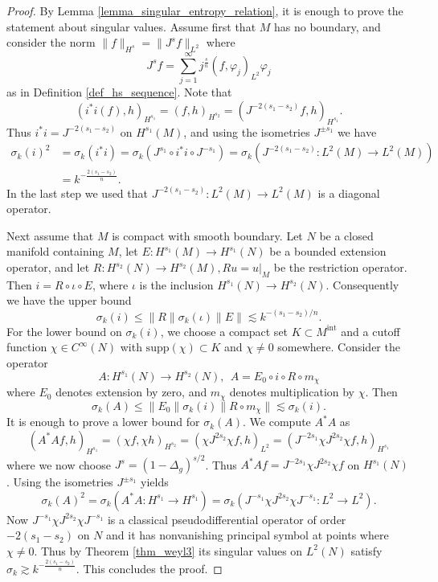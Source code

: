\documentclass[12pt,twoside]{amsart}
\numberwithin{equation}{section}
\renewcommand{\leq}{\leqslant}
\newcommand{\norm}[1]{\lVert #1 \rVert}         %
\begin{document}
\begin{proof}
By Lemma \ref{lemma_singular_entropy_relation}, it is enough to prove the statement about singular values. Assume first that $M$ has no boundary, and consider the norm $\norm{f}_{H^s} = \norm{J^s f}_{L^2}$ where $$J^s f = \sum_{j=1}^{\infty} j^{\frac{s}{n}} (f,\varphi_j)_{L^2} \varphi_j$$ as in Definition \ref{def_hs_sequence}. Note that 
\[
(i^* i(f), h)_{H^{s_1}} = (f, h)_{H^{s_2}} = (J^{-2(s_1-s_2)} f, h)_{H^{s_1}}.
\]
Thus $i^* i = J^{-2(s_1-s_2)}$ on $H^{s_1}(M)$, and using the isometries $J^{\pm s_1}$ we have 
\begin{align*}
\sigma_k(i)^2 &= \sigma_k(i^* i) = \sigma_k(J^{s_1} \circ i^* i \circ J^{-s_1}) = \sigma_k( J^{-2(s_1-s_2)}: L^2(M) \to L^2(M) ) \\
 &= k^{-\frac{2(s_1-s_2)}{n}}.
\end{align*}
In the last step we used that $J^{-2(s_1-s_2)}: L^2(M) \to L^2(M)$ is a diagonal operator.

Next assume that $M$ is compact with smooth boundary. Let $N$ be a closed manifold containing $M$, let $E: H^{s_1}(M) \to H^{s_1}(N)$ be a bounded extension operator, and let $R: H^{s_2}(N) \to H^{s_2}(M), Ru = u|_M$ be the restriction operator. Then $i = R \circ \iota \circ E$, where $\iota$ is the inclusion $H^{s_1}(N) \to H^{s_2}(N)$. Consequently we have the upper bound 
\[
\sigma_k(i) \leq \norm{R} \sigma_k(\iota) \norm{E} \lesssim  k^{-(s_1-s_2)/n}.
\]
For the lower bound on $\sigma_k(i)$, we choose a compact set $K \subset M^{\mathrm{int}}$ and a cutoff function $\chi \in C^{\infty}(N)$ with $\mathrm{supp}(\chi) \subset K$ and $\chi \neq 0$ somewhere. Consider the operator 
\[
A: H^{s_1}(N) \to H^{s_2}(N), \ \ A = E_0 \circ i \circ R \circ m_{\chi}
\]
where $E_0$ denotes extension by zero, and $m_{\chi}$ denotes multiplication by $\chi$. Then 
\[
\sigma_k(A) \leq \norm{E_0} \sigma_k(i) \norm{R \circ m_{\chi}} \lesssim \sigma_k(i).
\]
It is enough to prove a lower bound for $\sigma_k(A)$. We compute $A^* A$ as 
\[
(A^* A f, h)_{H^{s_1}} = (\chi f, \chi h)_{H^{s_2}} = (\chi J^{2s_2} \chi f, h)_{L^2} = (J^{-2s_1} \chi J^{2s_2} \chi f, h)_{H^{s_1}}
\]
where we now choose $J^s = (1-\Delta_g)^{s/2}$. Thus $A^* A f = J^{-2s_1} \chi J^{2s_2} \chi f$ on $H^{s_1}(N)$. Using the isometries $J^{\pm s_1}$ yields  
\[
\sigma_k(A)^2 = \sigma_k(A^* A: H^{s_1} \to H^{s_1}) = \sigma_k(J^{-s_1} \chi J^{2s_2} \chi J^{-s_1}: L^2 \to L^2).
\]
Now $J^{-s_1} \chi J^{2s_2} \chi J^{-s_1}$ is a classical pseudodifferential operator of order $-2(s_1-s_2)$ on $N$ and it has nonvanishing principal symbol at points where $\chi \neq 0$. Thus by Theorem \ref{thm_weyl3} its singular values on $L^2(N)$ satisfy $\sigma_k \gtrsim k^{-\frac{2(s_1-s_2)}{n}}$. This concludes the proof.
\end{proof}
\end{document}
